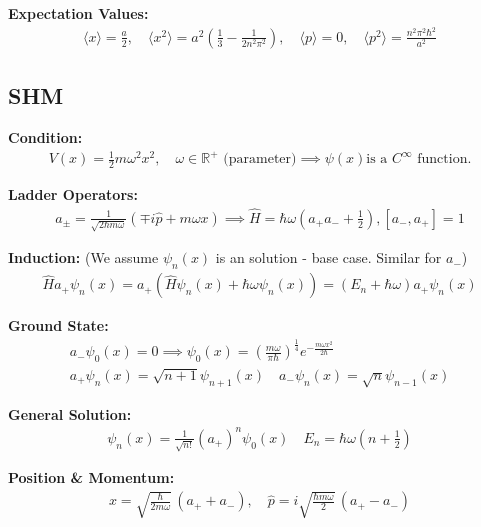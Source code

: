 \documentclass[12pt]{article}
\begin{document}
\textbf{Expectation Values: }
\begin{align}
    \langle x \rangle = \frac{a}{2}, \quad \langle x^2 \rangle = a^2\!\left(\frac{1}{3} - \frac{1}{2n^2\pi^2}\right), \quad \langle p \rangle = 0, \quad \langle p^2 \rangle = \frac{n^2\pi^2\hbar^2}{a^2}
\end{align}

\subsection{SHM } 

\textbf{Condition: } 
\begin{align}
    V(x) = \frac{1}{2} m \omega^2 x^2 , \quad \omega \in \mathbb{R}^+ \text{ (parameter)} \implies \psi(x) \text{is a $C^\infty$ function.}
\end{align} 

\textbf{Ladder Operators: }
\begin{align}
    a_\pm = \frac{1}{\sqrt{2\hbar m \omega}} \left( \mp i \hat{p} + m \omega x \right) \implies \hat{H} = \hbar \omega \left( a_+ a_- + \frac{1}{2} \right), [a_-,a_+] = 1
\end{align} 

\textbf{Induction: } (We assume $\psi_n(x)$ is an solution - base case. Similar for $a_-$)
\begin{align}
    \hat{H} a_+ \psi_n(x) = a_+ \left( \hat{H} \psi_n(x) + \hbar \omega \psi_n(x) \right) = (E_n + \hbar \omega) a_+ \psi_n(x) 
\end{align} 

\textbf{Ground State: }
\begin{align}
    a_- \psi_0(x) = 0 \implies \psi_0(x) = \left( \frac{m \omega}{\pi \hbar} \right)^{\frac{1}{4}} e^{-\frac{m \omega x^2}{2\hbar}} \\
    a_+ \psi_n(x) = \sqrt{n+1} \psi_{n+1}(x) \quad a_- \psi_n(x) = \sqrt{n} \psi_{n-1}(x) 
\end{align} 

\textbf{General Solution: } 
\begin{align}
    \psi_n(x) = \frac{1}{\sqrt{n!}} (a_+)^n \psi_0(x) \quad E_n = \hbar \omega \left( n + \frac{1}{2} \right)
\end{align}

\textbf{Position \& Momentum: }
\begin{align}
    x = \sqrt{\frac{\hbar}{2m\omega}}\,(a_+ + a_-), \quad \hat{p} = i\sqrt{\frac{\hbar m\omega}{2}}\,(a_+ - a_-)
\end{align}
\end{document}
